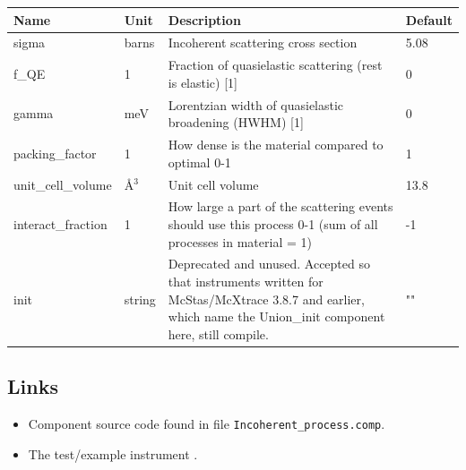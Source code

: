 \begin{longtable}{p{}p{}p{}p{}}
\toprule
\textbf{Name} & \textbf{Unit} & \textbf{Description} & \textbf{Default} \\
\midrule
\endhead
sigma & barns & Incoherent scattering cross section & 5.08 \\
f\_QE & 1 & Fraction of quasielastic scattering (rest is elastic) [1] & 0 \\
gamma & meV & Lorentzian width of quasielastic broadening (HWHM) [1] & 0 \\
packing\_factor & 1 & How dense is the material compared to optimal 0-1 & 1 \\
unit\_cell\_volume & \AA{}$^{3}$ & Unit cell volume & 13.8 \\
interact\_fraction & 1 & How large a part of the scattering events should use this process 0-1 (sum of all processes in material = 1) & -1 \\
init & string & Deprecated and unused. Accepted so that instruments written for McStas/McXtrace 3.8.7 and earlier, which name the Union\_init component here, still compile. & "" \\
\bottomrule
\end{longtable}

\subsection*{Links}
\begin{itemize}
  \item Component source code found in file \texttt{Incoherent\_process.comp}.
  \item The test/example instrument .
\end{itemize}
